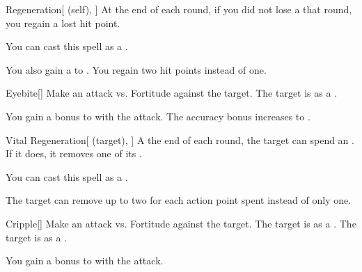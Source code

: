 \lowercase{\hypertarget{spell:Regeneration}{}}\label{spell:Regeneration}
\begin{attuneability}[Rank 4]{\hypertarget{spell:Regeneration}{Regeneration}}[ (self), ]
At the end of each round, if you did not lose a  that round, you regain a lost hit point.

You can cast this spell as a .

\rankline
{} You also gain a   to .
 You regain two hit points instead of one.
\end{attuneability}
\vspace{0.25em}



\lowercase{\hypertarget{spell:Eyebite}{}}\label{spell:Eyebite}
\begin{freeability}[Rank 5]{\hypertarget{spell:Eyebite}{Eyebite}}[]
Make an attack vs. Fortitude against the target.
\hit The target is  as a .

\rankline
{} You gain a  bonus to  with the attack.
 The accuracy bonus increases to .
\end{freeability}
\vspace{0.25em}



\lowercase{\hypertarget{spell:Vital Regeneration}{}}\label{spell:Vital Regeneration}
\begin{attuneability}[Rank 5]{\hypertarget{spell:Vital Regeneration}{Vital Regeneration}}[ (target), ]
A the end of each round, the target can spend an .
If it does, it removes one of its .

You can cast this spell as a .

\rankline
{} The target can remove up to two  for each action point spent instead of only one.
\end{attuneability}
\vspace{0.25em}



\lowercase{\hypertarget{spell:Cripple}{}}\label{spell:Cripple}
\begin{freeability}[Rank 6]{\hypertarget{spell:Cripple}{Cripple}}[]
Make an attack vs. Fortitude against the target.
\hit The target is  as a .
\crit The target is  as a .

\rankline
{} You gain a  bonus to  with the attack.
\end{freeability}
\vspace{0.25em}



